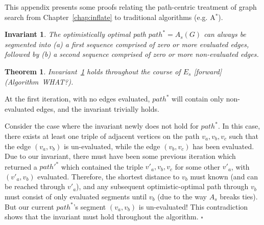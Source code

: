\documentclass{report}
\newtheorem{invariant}{Invariant}
\newtheorem{theorem}{Theorem}
\newenvironment{proof}[1][Proof]{\begin{trivlist}
   \item[\hskip \labelsep {\bfseries #1}]}{\hfill$\square$\end{trivlist}}
\begin{document}
This appendix presents some proofs relating the path-centric treatment
of graph search from Chapter~\ref{chap:inflate}
to traditional algorithms (e.g. A$^*$).

\begin{invariant}
The optimistically optimal path $path^* = A_s(G)$ can always be
segmented into
(a) a first sequence comprised of zero or more evaluated edges,
followed by
(b) a second sequence comprised of zero or more non-evaluated edges.
\label{inv:path-segmentation}
\end{invariant}

\begin{theorem}
Invariant~\ref{inv:path-segmentation} holds throughout the course of
$E_s$ [forward] (Algorithm~WHAT?).
\label{thm:seg-fwd}
\end{theorem}

\begin{proof}
At the first iteration, with no edges evaluated,
$path^*$ will contain only non-evaluated edges,
and the invariant trivially holds.

Consider the case where the invariant newly does not hold for $path^*$.
In this case, there exists at least one triple of adjacent vertices
on the path $v_a, v_b, v_c$
such that the edge $(v_a, v_b)$ is un-evaluated,
while the edge $(v_b, v_c)$ has been evaluated.
Due to our invariant,
there must have been some previous iteration which returned a
$path'^*$ which contained the triple
$v'_a, v_b, v_c$ for some other $v'_a$,
with $(v'_a, v_b)$ evaluated.
Therefore, the shortest distance to $v_b$ must known (and can be
reached through $v'_a$),
and any subsequent optimistic-optimal path through $v_b$
must consist of only evaluated segments until $v_b$
(due to the way $A_s$ breaks ties).
But our current $path^*$'s segment $(v_a, v_b)$ is un-evaluated!
This contradiction shows that the invariant must hold throughout the
algorithm.
\end{proof}
\end{document}
